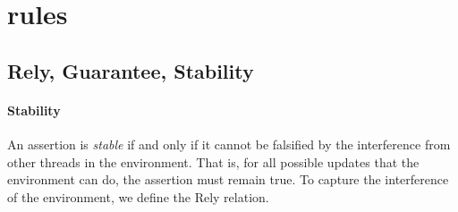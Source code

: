 \section{\colosl rules}

\subsection{Rely, Guarantee, Stability}
%
%
\paragraph{Stability}
An assertion is \emph{stable} if and only if it cannot be falsified by the interference from other threads in the environment. That is, for all possible updates that the environment can do, the assertion must remain true. To capture the interference of the environment, we define the Rely relation.
